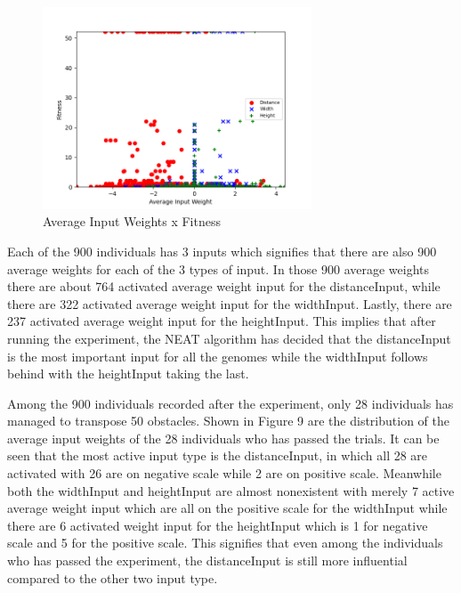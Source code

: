\documentclass[journal]{IEEEtran}
\begin{document}
\begin{figure}[htbp]
\begin{center}
\includegraphics[width=8cm, height=6cm]{scatterPlot.png}
\caption{Average Input Weights x Fitness}
\end{center}
\end{figure}

Each of the 900 individuals has 3 inputs which signifies that there are also 900 average weights for each of the 3 types of input. In those 900 average weights there are about 764 activated average weight input for the distanceInput, while there are 322 activated average weight input for the widthInput. Lastly, there are 237 activated average weight input for the heightInput. This implies that after running the experiment, the NEAT algorithm has decided that the distanceInput is the most important input for all the genomes while the widthInput follows behind with the heightInput taking the last.

Among the 900 individuals recorded after the experiment, only 28 individuals has managed to transpose 50 obstacles. Shown in Figure 9 are the distribution of the average input weights of the 28 individuals who has passed the trials. It can be seen that the most active input type is the distanceInput, in which all 28 are activated with 26 are on negative scale while 2 are on positive scale. Meanwhile both the widthInput and heightInput are almost nonexistent with merely 7 active average weight input which are all on the positive scale for the widthInput while there are 6 activated weight input for the heightInput which is 1 for negative scale and 5 for the positive scale. This signifies that even among the individuals who has passed the experiment, the distanceInput is still more influential compared to the other two input type.
\end{document}

